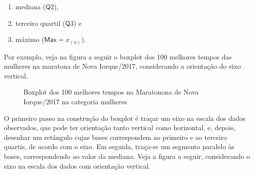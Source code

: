 {{{\begin{enumerate}
\item {} 
mediana (\(\textsf{Q}2\)),

\item {} 
terceiro quartil (\(\textsf{Q}3\)) e

\item {} 
máximo (\(\textsf{Max}=x_{(n)}\)).

\end{enumerate}

Por exemplo, veja na figura a seguir o boxplot dos 100 melhores tempos das mulheres na maratona de Nova Iorque/2017, considerando a orientação do  eixo vertical.

\begin{figure}[H]
\centering
{}
\caption{Boxplot dos 100 melhores tempos na Maratonona de Nova Iorque/2017 na categoria mulheres}\label{\detokenize{PE104-6:fig-boxplotmulheres}}\label{\detokenize{PE104-6:id3}}\end{figure}

O primeiro passo na construção do boxplot é traçar um eixo na escala dos dados observados, que pode ter orientação tanto vertical como horizontal, e, depois, desenhar um retângulo cujas bases correspondem ao primeiro e ao terceiro quartis, de acordo com o eixo. Em seguida, traça-se um segmento paralelo às bases, correspondendo ao valor da mediana. Veja a figura a seguir, considerando o eixo na escala dos dados com orientação vertical.

\begin{figure}[H]
\centering
\capstart

\end{figure}}}}

